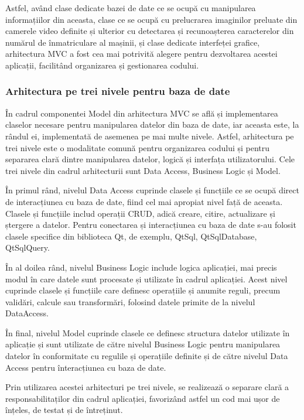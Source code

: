 \documentclass[12pt]{article}
\begin{document}
Astfel, av\^{a}nd clase dedicate bazei de date ce se ocup\u{a} cu manipularea informațiilor din aceasta, clase ce se ocup\u{a} cu prelucrarea imaginilor preluate din camerele video definite și ulterior cu detectarea și recunoașterea caracterelor din num\u{a}rul de \^{i}nmatriculare al mașinii, și clase dedicate interfeței grafice, arhitectura MVC a fost cea mai potrivit\u{a} alegere pentru dezvoltarea acestei aplicații, facilit\^{a}nd organizarea și gestionarea codului.

\subsubsection{Arhitectura pe trei nivele pentru baza de date}

\^{I}n cadrul componentei Model din arhitectura MVC se afl\u{a} și implementarea claselor necesare pentru manipularea datelor din baza de date, iar aceasta este, la r\^{a}ndul ei, implementat\u{a} de asemenea pe mai multe nivele. Astfel, arhitectura pe trei nivele este o modalitate comun\u{a} pentru organizarea codului și pentru separarea clar\u{a} dintre manipularea datelor, logic\u{a} și interfața utilizatorului. Cele trei nivele din cadrul arhitecturii sunt Data Access, Business Logic și Model.

\^{I}n primul r\^{a}nd, nivelul Data Access cuprinde clasele și funcțiile ce se ocup\u{a} direct de interacțiunea cu baza de date, fiind cel mai apropiat nivel faț\u{a} de aceasta. Clasele și funcțiile includ operații CRUD, adic\u{a} creare, citire, actualizare și ștergere a datelor. Pentru conectarea și interacțiunea cu baza de date s-au folosit clasele specifice din biblioteca Qt, de exemplu, QtSql, QtSqlDatabase, QtSqlQuery.

\^{I}n al doilea r\^{a}nd, nivelul Business Logic include logica aplicației, mai precis modul \^{i}n care datele sunt procesate și utilizate \^{i}n cadrul aplicației. Acest nivel cuprinde clasele și funcțiile care definesc operațiile și anumite reguli, precum valid\u{a}ri, calcule sau transform\u{a}ri, folosind datele primite de la nivelul DataAccess.

\^{I}n final, nivelul Model cuprinde clasele ce definesc structura datelor utilizate \^{i}n aplicație și sunt utilizate de c\u{a}tre nivelul Business Logic pentru manipularea datelor \^{i}n conformitate cu regulile și operațiile definite și de c\u{a}tre nivelul Data Access pentru \^{i}nteracțiunea cu baza de date.

Prin utilizarea acestei arhitecturi pe trei nivele, se realizeaz\u{a} o separare clar\u{a} a responsabilitaților din cadrul aplicației, favoriz\^{a}nd astfel un cod mai ușor de \^{i}nțeles, de testat și de \^{i}ntreținut.
\end{document}

